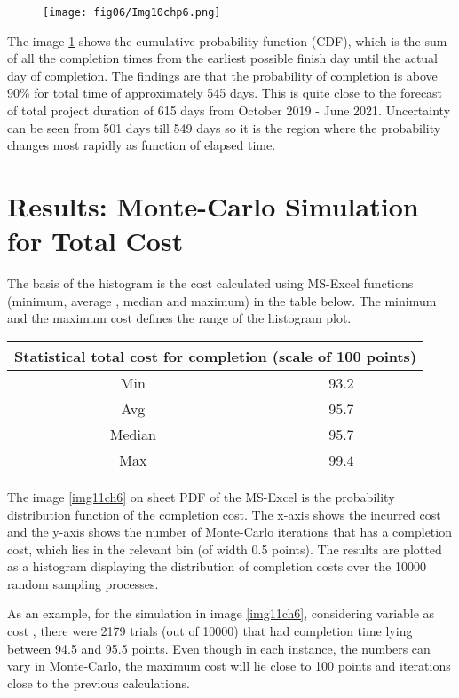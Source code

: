 \begin{figure}
	\centering
	\texttt{[image: fig06/Img10chp6.png]}
	\label{img10ch6}
\end{figure}


The image \ref{img10ch6} shows the cumulative probability function (CDF), which is the sum of all the completion times from the earliest possible finish day until the actual day of completion. The findings are that the probability of completion is above 90\% 
for total time of approximately 545 days. This is quite close to the forecast of total project duration of 615 days from October 2019 - June 2021. Uncertainty can be seen from 501 days till 549 days so it is the region where the probability changes most rapidly as function of elapsed time.


\section{Results: Monte-Carlo Simulation for  Total Cost}\label{section6.2}

The basis of the histogram is the cost calculated using MS-Excel functions (minimum, average , median and maximum) in the table below. The minimum and the maximum cost defines the range of the histogram plot.
\begin{center}
	\begin{tabular}{ |c|c|} 
		\hline
		\multicolumn{2}{|c|}{Statistical total cost for completion (scale of 100 points)} \\
		\hline
		Min & 93.2  \\
		\hline
		Avg &  95.7\\ 
		\hline
		Median & 95.7 \\ 
		\hline
		Max & 99.4\\ 
		\hline
	\end{tabular}
\end{center}


The image \ref{img11ch6} on sheet PDF of the MS-Excel is the probability distribution function of the completion cost. The x-axis shows the incurred cost and the y-axis shows the number of Monte-Carlo iterations that has a completion cost, which lies in the relevant bin (of width 0.5 points). The results are plotted as a histogram displaying the distribution of completion costs over the 10000 random sampling processes.


As an example, for the simulation in image  \ref{img11ch6}, considering variable as cost , there were 2179  trials (out of 10000) that had completion time lying between 94.5 and 95.5 points. Even though in each instance, the numbers can vary in Monte-Carlo, the maximum cost will lie close to 100 points and iterations close to the previous calculations.

